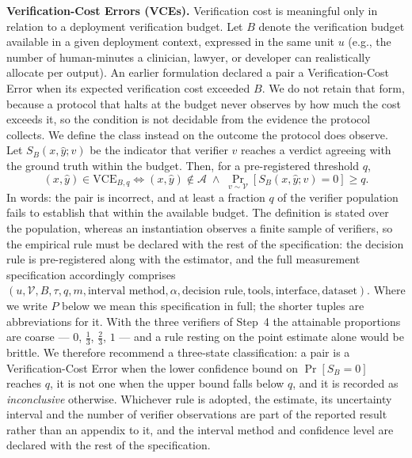 \documentclass[11pt]{article}
\newcommand{\viola}[1]{\textcolor[HTML]{7030A0}{#1}}
\newcommand{\viola}[1]{#1}
\begin{document}
\textbf{Verification-Cost Errors (VCEs).} {Verification cost is meaningful only in relation to a deployment verification budget. Let $B$ denote the verification budget available in a given deployment context, expressed in the same unit $u$ (e.g., the number of human-minutes a clinician, lawyer, or developer can realistically allocate per output).
\viola{An earlier formulation declared a pair a Verification-Cost Error when its expected verification cost exceeded $B$. We do not retain that form, because a protocol that halts at the budget never observes by how much the cost exceeds it, so the condition is not decidable from the evidence the protocol collects. We define the class instead on the outcome the protocol does observe. Let $S_B(x,\hat{y};v)$ be the indicator that verifier $v$ reaches a verdict agreeing with the ground truth within the budget. Then, for a pre-registered threshold $q$,}
\[
(x,\hat{y}) \in \mathrm{VCE}_{B,q}
\iff
(x,\hat{y}) \notin \mathcal{A}
\;\wedge\;
\Pr_{v\sim\mathcal{V}}\!\left[S_B(x,\hat{y};v)=0\right] \ge q .
\]
\viola{In words: the pair is incorrect, and at least a fraction $q$ of the verifier population fails to establish that within the available budget. The definition is stated over the population, whereas an instantiation observes a finite sample of verifiers, so the empirical rule must be declared with the rest of the specification: the decision rule is pre-registered along with the estimator, and the full measurement specification accordingly comprises \mbox{$(u,\mathcal{V},B,\tau,q,m,\text{interval method},\alpha,\text{decision rule},\text{tools},\text{interface},\text{dataset})$}. \viola{Where we write $P$ below we mean this specification in full; the shorter tuples are abbreviations for it.} With the three verifiers of Step~4 the attainable proportions are coarse --- $0$, $\tfrac13$, $\tfrac23$, $1$ --- and a rule resting on the point estimate alone would be brittle. We therefore recommend a three-state classification: a pair is a Verification-Cost Error when the lower confidence bound on \mbox{$\Pr[S_B=0]$} reaches $q$, it is not one when the upper bound falls below $q$, and it is recorded as \emph{inconclusive} otherwise. Whichever rule is adopted, the estimate, its uncertainty interval and the number of verifier observations are part of the reported result rather than an appendix to it, and the interval method and confidence level are declared with the rest of the specification.
}}
\end{document}
